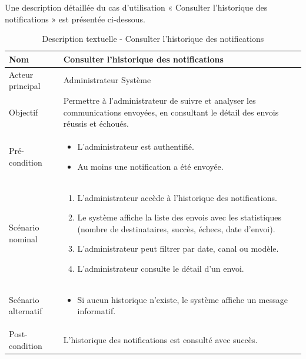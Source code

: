 Une description détaillée du cas d'utilisation « Consulter l'historique des notifications » est présentée ci-dessous.

\begin{table}[H]
\centering
\begin{tabular}{ |p{4cm}|p{12cm}|} \hline

Nom & Consulter l'historique des notifications \\ \hline

Acteur principal & Administrateur Système \\ \hline

Objectif & Permettre à l'administrateur de suivre et analyser les communications envoyées, en consultant le détail des envois réussis et échoués. \\ \hline

Pré-condition &
\begin{itemize}
    \item L'administrateur est authentifié.
    \item Au moins une notification a été envoyée.
\end{itemize}
\\ \hline

Scénario nominal &
\begin{enumerate}
    \item L'administrateur accède à l'historique des notifications.
    \item Le système affiche la liste des envois avec les statistiques (nombre de destinataires, succès, échecs, date d'envoi).
    \item L'administrateur peut filtrer par date, canal ou modèle.
    \item L'administrateur consulte le détail d'un envoi.
\end{enumerate}
\\ \hline

Scénario alternatif &
\begin{itemize}
    \item Si aucun historique n'existe, le système affiche un message informatif.
\end{itemize}
\\ \hline

Post-condition &
L'historique des notifications est consulté avec succès. \\ \hline

\end{tabular}
\caption{Description textuelle - Consulter l'historique des notifications}
\label{tab:historique-notifications}
\end{table}


